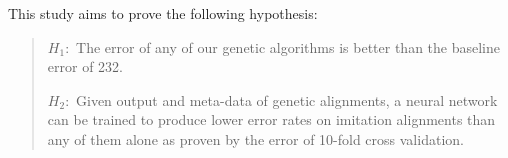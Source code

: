 This study aims to prove the following hypothesis:
	\begin{quote}
		$H_{1}:$ The error of any of our genetic algorithms is better than the baseline error of 232.

		$H_{2}:$ Given output and meta-data of genetic alignments, a neural network can be trained to produce lower error rates on imitation alignments than any of them alone as proven by the error of 10-fold cross validation.

	\end{quote}

